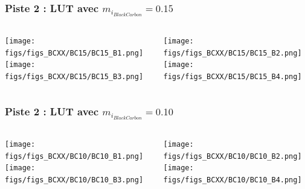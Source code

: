 \documentclass[8pt]{beamer}
\begin{document}
\begin{frame}
\frametitle{Piste 2 : LUT avec $m_{i_{Black Carbon}} = 0.15$}
	\begin{columns}
		\begin{column}{0.5\textwidth}
			\begin{center}
	     		\texttt{[image: figs/figs\_BCXX/BC15/BC15\_B1.png]}	
		     	\texttt{[image: figs/figs\_BCXX/BC15/BC15\_B3.png]}
		    \end{center}		
		    
		\end{column}
		\begin{column}{0.5\textwidth}
			\begin{center}
		     	\texttt{[image: figs/figs\_BCXX/BC15/BC15\_B2.png]}
		     	\texttt{[image: figs/figs\_BCXX/BC15/BC15\_B4.png]}
		    \end{center}				
		\end{column}
	\end{columns}
\end{frame}

\begin{frame}
\frametitle{Piste 2 : LUT avec $m_{i_{Black Carbon}} = 0.10$}
	\begin{columns}
		\begin{column}{0.5\textwidth}
			\begin{center}
	     		\texttt{[image: figs/figs\_BCXX/BC10/BC10\_B1.png]}	
		     	\texttt{[image: figs/figs\_BCXX/BC10/BC10\_B3.png]}
		    \end{center}		
		    
		\end{column}
		\begin{column}{0.5\textwidth}
			\begin{center}
		     	\texttt{[image: figs/figs\_BCXX/BC10/BC10\_B2.png]}
		     	\texttt{[image: figs/figs\_BCXX/BC10/BC10\_B4.png]}
		    \end{center}				
		\end{column}
	\end{columns}
\end{frame}

%
\end{document}
